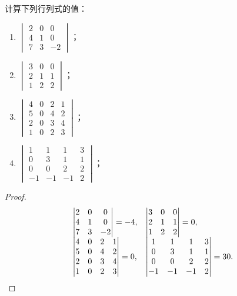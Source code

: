 \begin{problem}
计算下列行列式的值：
\begin{enumerate}
    \item \(\begin{vmatrix}2&0&0\\4&1&0\\7&3&-2\end{vmatrix}\)；
    \item \(\begin{vmatrix}3&0&0\\2&1&1\\1&2&2\end{vmatrix}\)；
    \item \(\begin{vmatrix}4&0&2&1\\5&0&4&2\\2&0&3&4\\1&0&2&3\end{vmatrix}\)；
    \item \(\begin{vmatrix}1&1&1&3\\0&3&1&1\\0&0&2&2\\-1&-1&-1&2\end{vmatrix}\)；
\end{enumerate}
\end{problem}
\begin{proof}
    \begin{equation*}
        \begin{array}[2]{ll}
            \begin{vmatrix}2&0&0\\4&1&0\\7&3&-2\end{vmatrix}=-4,              & \begin{vmatrix}3&0&0\\2&1&1\\1&2&2\end{vmatrix}=0,                    \\
            \begin{vmatrix}4&0&2&1\\5&0&4&2\\2&0&3&4\\1&0&2&3\end{vmatrix}=0, & \begin{vmatrix}1&1&1&3\\0&3&1&1\\0&0&2&2\\-1&-1&-1&2\end{vmatrix}=30.
        \end{array}
    \end{equation*}
\end{proof}

